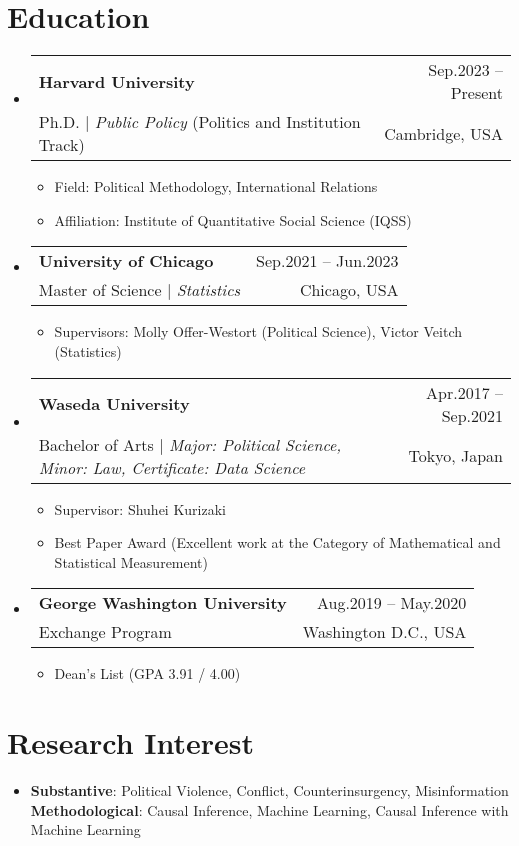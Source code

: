 \documentclass[letterpaper,11pt]{article} %
\makeatletter
\newcommand{\CVItem}[1]{
  \item\small{
    {#1 \vspace{-2pt}}
  }
}
\newcommand{\CVSubheading}[4]{
  \vspace{-2pt}\item
    \begin{tabular*}{0.97\textwidth}[t]{l@{\extracolsep{\fill}}r}
      \textbf{#1} & #2 \\
      \small#3 & \small #4 \\
    \end{tabular*}\vspace{-7pt}
}
\newcommand{\CVSubHeadingListStart}{\begin{itemize}[leftmargin=0.5cm, label={}]}
\newcommand{\CVSubHeadingListEnd}{\end{itemize}}
\newcommand{\CVItemListStart}{\begin{itemize}}
\newcommand{\CVItemListEnd}{\end{itemize}\vspace{-5pt}}
\makeatother
\begin{document}
\section{Education}
  \CVSubHeadingListStart
    \CVSubheading %
     {{Harvard University}}{Sep.2023 -- Present}
      {Ph.D. $|$ \emph{Public Policy} (Politics and Institution Track)}{Cambridge, USA}
      \CVItemListStart
        \CVItem{Field: Political Methodology, International Relations}
        \CVItem{Affiliation: Institute of Quantitative Social Science (IQSS)}
       \CVItemListEnd
    \CVSubheading
      {{University of Chicago}}{Sep.2021 -- Jun.2023}
      {Master of Science $|$ \emph{Statistics}}{Chicago, USA}
       \CVItemListStart
        \CVItem{Supervisors: Molly Offer-Westort (Political Science), Victor Veitch (Statistics)}

    \CVItemListEnd
    \CVSubheading
      {{Waseda University}}{Apr.2017 -- Sep.2021}
      {Bachelor of Arts $|$ \emph{\small{Major: Political Science, Minor: Law,  Certificate: Data Science}}}{Tokyo, Japan}
      \CVItemListStart
        \CVItem{Supervisor: Shuhei Kurizaki}
        \CVItem{Best Paper Award (Excellent work at the Category of Mathematical and Statistical Measurement)}
    \CVItemListEnd
    \CVSubheading
      {George Washington University}{Aug.2019 -- May.2020}
      {Exchange Program}{Washington D.C., USA}
      \CVItemListStart
        \CVItem{Dean's List (GPA 3.91 / 4.00)} %
    \CVItemListEnd
  \CVSubHeadingListEnd

\section{Research Interest}
\begin{itemize}[leftmargin=0.5cm, label={}]
    \item{
     \textbf{Substantive}{: Political Violence, Conflict, Counterinsurgency, Misinformation}\\
     \textbf{Methodological}{: Causal Inference, Machine Learning, Causal Inference with Machine Learning} \\
    }
 \end{itemize}
\end{document}
